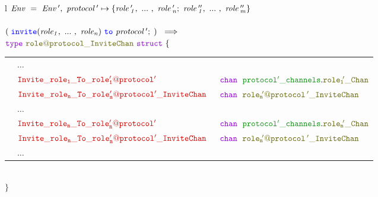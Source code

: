 \documentclass[12pt,twoside]{report}
\begin{document}
\begin{figure}[!h]
    \begin{center}
        \begin{tabular}{l}
            $\mathit{Env\ =\ Env\,',\ protocol\,' \mapsto \{\roles{role\,'}{n};\ \roles{role\,''}{m}\}}$\\\\

            $(\;\invite(\roles{role}{n})\ \scrto\ \mathit{protocol\,'};\;)\ \implies$\\[6pt]
            $\gotype\ \structname{\localprotocol{role}{protocol}\_InviteChan}\ \gostruct\ \{$\\[3pt]
            \begin{tabular}{lll}
                \indent & $\dots$ & \\[9pt]
                \indent & $\structfield{Invite\_role_1\_To\_\localprotocol{role'_1}{protocol'}}$\ &$\gochan\ \;\pkgstructaccess{protocol'\_channels}{role_1\!'\_Chan}$\\
                \indent & $\structfield{Invite\_role_n\_To\_\localprotocol{role'_n}{protocol'}\_InviteChan}$\ &$\gochan\ \; \structname{\localprotocol{role_n\!'}{protocol\,'}\_InviteChan}$\\
                \indent & $\dots$ & \\
                \indent & $\structfield{Invite\_role_n\_To\_\localprotocol{role'_n}{protocol'}}$\ &$\gochan\ \;\pkgstructaccess{protocol'\_channels}{role_n\!'\_Chan}$\\
                \indent & $\structfield{Invite\_role_n\_To\_\localprotocol{role'_n}{protocol'}\_InviteChan}$\ &$\gochan\ \; \structname{\localprotocol{role_n\!'}{protocol\,'}\_InviteChan}$\\[7pt]
                \indent & $\dots$ & 
            \end{tabular}\\
            $\}$\\\\[5pt]



\end{tabular}
\end{center}
\end{figure}
\end{document}

